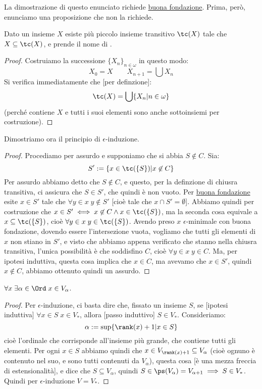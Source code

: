 \documentclass[11pt]{scrartcl}
\begin{document}
La dimostrazione di questo enunciato richiede \hyperref[ax10]{buona fondazione}. Prima, però, enunciamo una proposizione che non la richiede.

\begin{proposition}
	Dato un insieme $X$ esiste più piccolo insieme transitivo $\tc(X)$ tale che $X \subseteq \tc(X)$, e prende il nome di .
\end{proposition}

\begin{proof}
	Costruiamo la successione $\{X_n\}_{n \in \omega}$ in questo modo:
	\[ X_0 = X \qquad X_{n+1} = \bigcup X_n
		\]
	Si verifica immediatamente che [per definzione]:
	\[ \tc(X) = \bigcup\{X_n | n \in \omega\}
		\]
	(perché contiene $X$ e tutti i suoi elementi sono anche sottoinsiemi per costruzione).
\end{proof}

Dimostriamo ora il principio di $\epsilon$-induzione.

\begin{proof}
	Procediamo per assurdo e supponiamo che si abbia $S \not \in C$. Sia:
	\[ S' := \{x \in \tc(\{S\}) | x \not \in C\}
		\]
	Per assurdo abbiamo detto che $S \not \in C$, e questo, per la definzione di chiusra transitiva, ci assicura che $S \in S'$, che quindi è non vuoto. Per \hyperref[ax10]{buona fondazione} esite $x \in S'$ tale che $\forall y \in x \; y \not \in S'$ [cioè tale che $x \cap S' = \emptyset$].
	Abbiamo quindi per costruzione che $x \in S' \iff x \not \in C \land x \in \tc(\{S\})$, ma la seconda cosa equivale a $x \subseteq \tc(\{S\})$, cioè $\forall y \in x \; y \in \tc(\{S\})$. Avendo preso $x$ $\epsilon$-minimale con buona fondazione, dovendo essere l'intersezione vuota, vogliamo che tutti gli elementi di $x$
	non stiano in $S'$, e visto che abbiamo appena verificato che stanno nella chiusra transitiva, l'unica possibilità è che soddisfino $C$, cioè $\forall y \in x \; y \in C$.
	Ma, per ipotesi induttiva, questa cosa implica che $x \in C$, ma avevamo che $x \in S'$, quindi $x \not \in C$, abbiamo ottenuto quindi un assurdo.
\end{proof}

\begin{proposition}[$V = V_*$]
	$\forall x \; \exists \alpha \in \Ord \; x \in V_\alpha$.
\end{proposition}

\begin{proof}
	Per $\epsilon$-induzione, ci basta dire che, fissato un insieme $S$, se [ipotesi induttiva] $\forall x \in S \; x \in V_*$, allora [passo induttivo] $S \in V_*$. Consideriamo:
	\[ \alpha := \sup\{\rank(x) + 1 | x \in S\}
		\]
	cioè l'ordinale che corrisponde all'insieme più grande, che contiene tutti gli elementi. Per ogni $x \in S$ abbiamo quindi che $x \in V_{\rank(x) + 1} \subseteq V_{\alpha}$ (cioè ognuno è contenuto nel suo, e sono tutti contenuti da $V_\alpha$), questa cosa [è una mezza freccia di estensionalità],
	e dice che $S\subseteq V_\alpha$, quindi $S \in \ps(V_\alpha) = V_{\alpha + 1} \implies S \in V_*$. Quindi per $\epsilon$-induzione $V = V_*$.
\end{proof}
\end{document}
